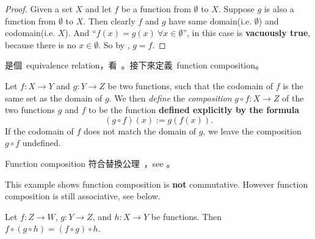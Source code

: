 \begin{proof}
Given a set \(X\) and let \(f\) be a function from \(\emptyset\) to \(X\).
Suppose \(g\) is also a function from \(\emptyset\) to \(X\).
Then clearly \(f\) and \(g\) have same domain(i.e. \(\emptyset\)) and codomain(i.e. \(X\)).
And ``\(f(x) = g(x)\ \forall x \in \emptyset\)'', in this case is \textbf{vacuously true}, because there is no \(x \in \emptyset\).
So by , \(g = f\).
\end{proof}

\begin{note}
 是個\ equivalence relation，看\ 。接下來定義\ function composition。
\end{note}

\begin{definition} [Composition] \label{def 3.3.10}
Let \(f : X \rightarrow Y\) and \(g : Y \rightarrow Z\) be two functions, such that the codomain of \(f\) is the same set as the domain of \(g\).
We then \emph{define} the \emph{composition} \(g \circ f : X \rightarrow Z\) of the two functions \(g\) and \(f\) to be the function \textbf{defined explicitly by the formula}
\[
    (g \circ f)(x) := g(f(x)).
\]
If the codomain of \(f\) does not match the domain of \(g\), we leave the composition \(g \circ f\) undefined.
\end{definition}

\begin{note}
Function composition 符合替換公理\ ，see 。
\end{note}

\begin{example}
This example shows function composition is \textbf{not} commutative. However function composition is still associative, see below.
\end{example}

\begin{lemma}  \label{lem 3.3.12}
Let \(f : Z \rightarrow W\), \(g : Y \rightarrow Z\), and \(h : X \rightarrow Y\) be functions. Then \(f \circ (g \circ h) = (f \circ g) \circ h\).
\end{lemma}

